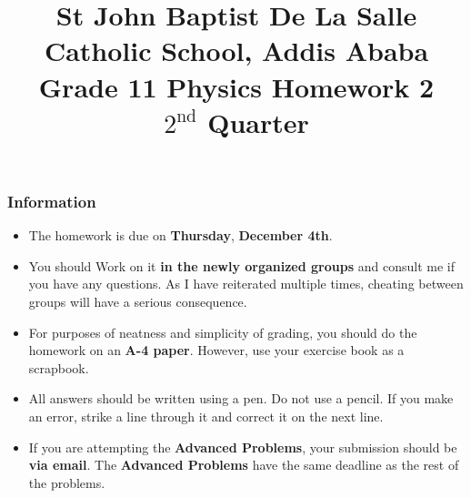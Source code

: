 \documentclass[12pt,addpoints]{exam}
\begin{document}
	\title{St John Baptist De La Salle Catholic School, Addis Ababa\\
		\large Grade 11 Physics Homework 2\\
		$2^\text{nd}$ Quarter}
	\maketitle
	\begin{center}
		\subsubsection*{Information}
		\begin{itemize}
			\item The homework is due on \textbf{Thursday}, \textbf{December 4th}.
			\item You should Work on it \textbf{in the newly organized groups} and consult me if you have any questions. As I have reiterated multiple times, cheating between groups will have a serious consequence.
			\item For purposes of neatness and simplicity of grading, you should do the homework on an \textbf{A-4 paper}. However, use your exercise book as a scrapbook.
			\item All answers should be written using a pen. Do not use a pencil. If you make an error, strike a line through it and correct it on the next line.
			\item If you are attempting the \textbf{Advanced Problems}, your submission should be \textbf{via email}. The \textbf{Advanced Problems }have the same deadline as the rest of the problems. 
		\end{itemize}
	\end{center}
	\newpage
\end{document}
